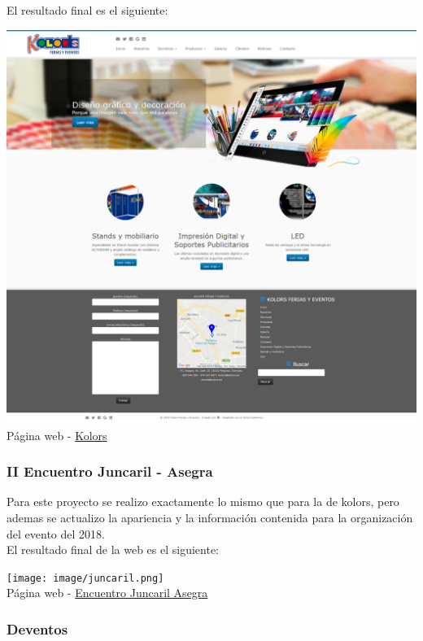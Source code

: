 		El resultado final es el siguiente:
		\begin{center}
			\includegraphics[scale=0.2]{image/kolors.png}\\
			Página web - \href{http://www.kolors.es/}{Kolors}
		\end{center}
		
		\newpage
		
		\subsubsection{II Encuentro Juncaril - Asegra}
		
		Para este proyecto se realizo exactamente lo mismo que para la de kolors, pero ademas se actualizo la apariencia y la información contenida para la organización del evento del 2018. \\
		
		El resultado final de la web es el siguiente:
		
		\begin{center}
			\texttt{[image: image/juncaril.png]}\\
			Página web - \href{http://encuentrojuncaril-asegra.com/}{Encuentro Juncaril Asegra}
		\end{center}
		
		\newpage
		
		\subsubsection{Deventos}
		

